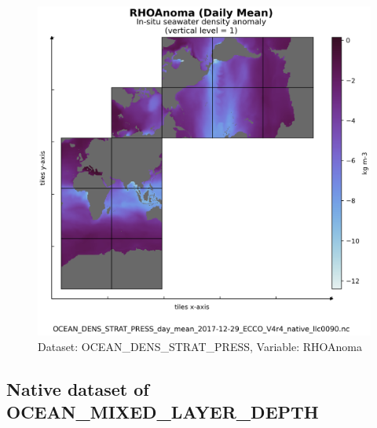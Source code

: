 \begin{figure}[H]
\centering
\includegraphics[scale=0.55]{../images/plots/v4r4/native_plots/Ocean_Density_Stratification_and_Hydrostatic_Pressure/RHOAnoma.png}
\caption{Dataset: OCEAN\_DENS\_STRAT\_PRESS, Variable: RHOAnoma}
\label{tab:table-OCEAN_DENS_STRAT_PRESS_RHOAnoma-Plot}
\end{figure}
\newpage
\subsection{Native dataset of OCEAN\_MIXED\_LAYER\_DEPTH}
\newp
